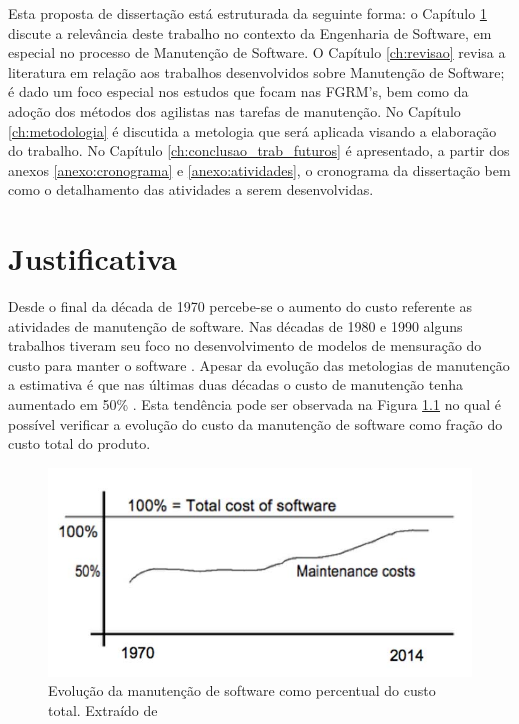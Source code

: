 \documentclass[msc,proposal,hidelot,hideabstract]{ppgccufmg} %
\begin{document}
Esta proposta de dissertação está estruturada da seguinte forma: o  Capítulo
\ref{ch:justificativa} discute a relevância deste trabalho no contexto da Engenharia de Software, em especial no processo de Manutenção de Software. O Capítulo \ref{ch:revisao} revisa a literatura em relação aos trabalhos desenvolvidos sobre Manutenção de Software; é dado um foco especial
nos estudos que focam nas FGRM's, bem como da adoção dos métodos dos agilistas nas tarefas de manutenção. No Capítulo \ref{ch:metodologia} é discutida a metologia que será aplicada visando a elaboração do trabalho. No Capítulo \ref{ch:conclusao_trab_futuros} é apresentado, a partir dos anexos \ref{anexo:cronograma} e \ref{anexo:atividades}, o cronograma da dissertação bem como o detalhamento das atividades a serem desenvolvidas.

\chapter{Justificativa}
\label{ch:justificativa}
Desde o final da década de 1970 \cite{Zelkowitz:1979:PSE:578504} percebe-se o aumento do custo referente as atividades de  manutenção de software. Nas décadas de 1980 e 1990 alguns
trabalhos tiveram seu foco no desenvolvimento de modelos de mensuração do custo
para manter o software \cite{Herrin:1985:SMC:323287.323383,hirota1994approach}. Apesar da evolução das metologias de manutenção a estimativa é que nas últimas duas décadas o custo de manutenção tenha aumentado em 50\% \cite{koskinen2010software}. Esta tendência pode ser observada na Figura \ref{fig:software-maintence-costs} no qual é possível verificar a evolução do custo da manutenção de software como fração do custo total do produto.

\begin{figure}
\centering
\includegraphics[width=0.7\linewidth]{../img/software-maintence-costs}
\caption{Evolução da manutenção de software como percentual do custo total.	Extraído de	\cite{engelbertink2010save}}

\label{fig:software-maintence-costs}
\end{figure}
\end{document}
